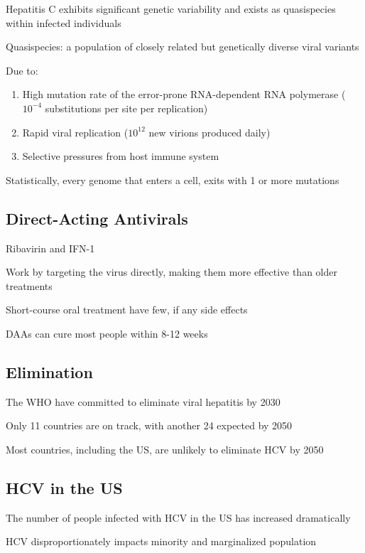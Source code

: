 \documentclass{notes}
\begin{document}
Hepatitis C exhibits significant genetic variability and exists as quasispecies within infected individuals

\tab Quasispecies: a population of closely related but genetically diverse viral variants

Due to:

\begin{enumerate}
    \item High mutation rate of the error-prone RNA-dependent RNA polymerase (\(10^{-4}\) substitutions per site per replication)
    \item Rapid viral replication (\(10^{12}\) new virions produced daily)
    \item Selective pressures from host immune system
\end{enumerate}

Statistically, every genome that enters a cell, exits with 1 or more mutations

\subsection{Direct-Acting Antivirals}

Ribavirin and IFN-1

Work by targeting the virus directly, making them more effective than older treatments


Short-course oral treatment have few, if any side effects

\tab DAAs can cure most people within 8-12 weeks

\subsection{Elimination}

The WHO have committed to eliminate viral hepatitis by 2030

\tab Only 11 countries are on track, with another 24 expected by 2050

\tab Most countries, including the US, are unlikely to eliminate HCV by 2050

\subsection{HCV in the US}

The number of people infected with HCV in the US has increased dramatically

HCV disproportionately impacts minority and marginalized population
\end{document}
